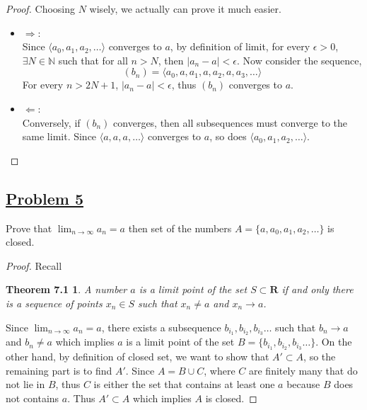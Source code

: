 \documentclass[10pt,letterpaper]{article}
\begin{document}
	\begin{proof}
		Choosing $N$ wisely, we actually can prove it much easier.
		\begin{itemize}
			\item $\Rightarrow$: \\
			Since $\langle a_0, a_1, a_2, \ldots \rangle$ converges to $a$, by definition of limit,
			for every $\epsilon > 0$, $\exists N \in \mathbb{N}$ such that for all 
			$n > N$, then $|a_n - a| < \epsilon$. Now consider the sequence,
			$$(b_n) = \langle a_0, a, a_1, a, a_2, a, a_3, \ldots \rangle$$
			For every $n > 2N + 1$, $|a_n - a| < \epsilon$, thus $(b_n)$ converges
			to $a$.
			
			\item $\Leftarrow$: \\
			Conversely, if $(b_n)$ converges, then all subsequences must converge
			to the same limit. Since $\langle a, a, a, \ldots \rangle$ converges to $a$, so does
			$\langle a_0, a_1, a_2, \ldots \rangle$.
		\end{itemize}
	\end{proof}
	\subsection*{{\color{purple}\underline{Problem 5}}}
	Prove that $\displaystyle\lim_{n\to \infty}a_n = a$ then set of the numbers
	$A = \{a, a_0, a_1, a_2, \ldots \}$ is closed. 
	\begin{proof}
		Recall
		\newtheorem*{theo}{Theorem 7.1}
		\begin{theo}
			A number $a$ is a limit point of the set $S \subset \mathbf{R}$ if and only 
			there is a sequence of points $x_n \in S$ such that $x_n \neq a$ and $x_n \rightarrow a$.
		\end{theo}
		Since $\displaystyle\lim_{n\to\infty} a_n = a$, there exists a subsequence
		$b_{i_1}, b_{i_2}, b_{i_3} \ldots$ such that $b_n \rightarrow a$ and $b_n \neq a$ which implies
		$a$ is a limit point of the set $B = \{b_{i_1}, b_{i_2}, b_{i_3} \ldots\}$. On the other hand,
		by definition of closed set, we want to show that $A' \subset A$, so the remaining part is
		to find $A'$. Since $A = B \cup C$, where $C$ are finitely many that do not lie in $B$,
		thus $C$ is either the set that contains at least one $a$ because $B$ does not contains $a$.
		Thus $A' \subset A$ which implies $A$ is closed. 
		
	\end{proof}
		
\end{document}
